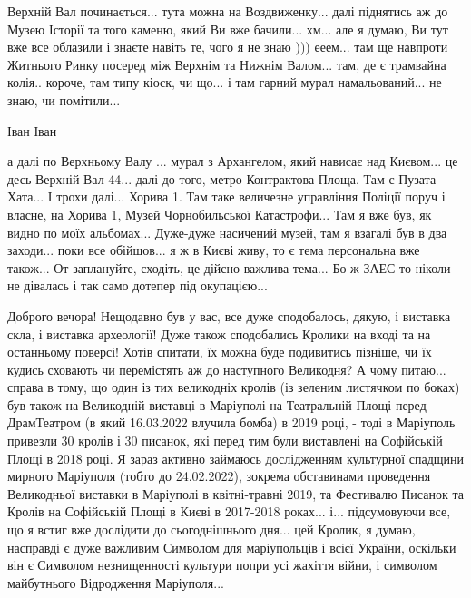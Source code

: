 Верхній Вал починається... тута можна на Воздвиженку... далі піднятись аж до
Музею Історії та того каменю, який Ви вже бачили... хм... але я думаю, Ви тут
вже все облазили і знаєте навіть те, чого я не знаю ))) ееем... там ще навпроти
Житнього Ринку посеред між Верхнім та Нижнім Валом... там, де є трамвайна
колія.. короче, там типу кіоск, чи що... і там гарний мурал намальований... не
знаю, чи помітили...

Іван Іван

а далі по Верхньому Валу ... мурал з Архангелом, який нависає над Києвом... це
десь Верхній Вал 44... далі до того, метро Контрактова Площа. Там є Пузата
Хата... І трохи далі... Хорива 1. Там таке величезне управління Поліції поруч і
власне, на Хорива 1, Музей Чорнобильської Катастрофи... Там я вже був, як видно
по моїх альбомах... Дуже-дуже насичений музей, там я взагалі був в два
заходи... поки все обійшов... я ж в Києві живу, то є тема персональна вже
також... От заплануйте, сходіть, це дійсно важлива тема... Бо ж ЗАЕС-то ніколи
не дівалась і так само дотепер під окупацією...

Доброго вечора! Нещодавно був у вас, все дуже сподобалось, дякую, і виставка
скла, і виставка археології! Дуже також сподобались Кролики на вході та на
останньому поверсі! Хотів спитати, їх можна буде подивитись пізніше, чи їх
кудись сховають чи перемістять аж до наступного Великодня? А чому питаю...
справа в тому, що один із тих великодніх кролів (із зеленим листячком по боках)
був також на Великодній виставці в Маріуполі на Театральній Площі перед
ДрамТеатром (в який 16.03.2022 влучила бомба) в 2019 році, - тоді в Маріуполь
привезли 30 кролів і 30 писанок, які перед тим були виставлені на Софійській
Площі в 2018 році. Я зараз активно займаюсь дослідженням культурної спадщини
мирного Маріуполя (тобто до 24.02.2022), зокрема обставинами проведення
Великодньої виставки в Маріуполі в квітні-травні 2019, та Фестивалю Писанок та
Кролів на Софійській Площі в Києві в 2017-2018 роках... і... підсумовуючи все,
що я встиг вже дослідити до сьогоднішнього дня... цей Кролик, я думаю,
насправді є дуже важливим Символом для маріупольців і всієї України, оскільки
він є Символом незнищенності культури попри усі жахіття війни, і символом
майбутнього Відродження Маріуполя...
